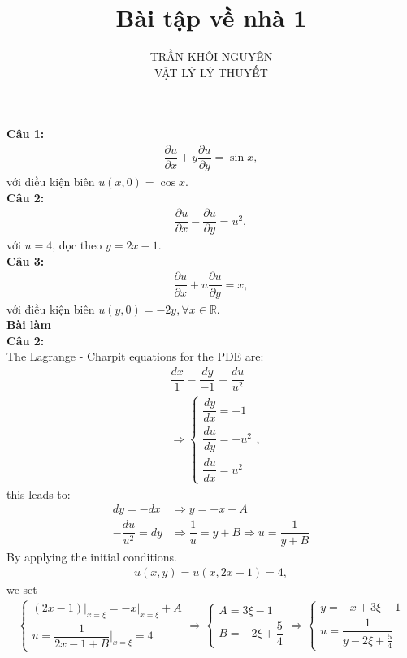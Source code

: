 \documentclass{article}
\title{\Huge{Bài tập về nhà 1}}
\newcommand{\f}[2]{\dfrac{#1}{#2}}
\newcommand{\at}[2]{\bigg\rvert_{#1}^{#2} }
\begin{document}
\setlength{\parindent}{20pt}
\newpage
\author{TRẦN KHÔI NGUYÊN \\ VẬT LÝ LÝ THUYẾT}
\maketitle
\noindent \textbf{Câu 1:}
\begin{align*}
	\f{\partial u}{\partial x} + y \f{\partial u}{\partial y} = \sin x,
\end{align*}
với điều kiện biên $u(x,0) = \cos x$. \\
\textbf{Câu 2:}
\begin{align*}
	\f{\partial u}{\partial x} - \f{\partial u}{\partial y} = u^{2},
\end{align*}
với $u = 4$, dọc theo $y = 2x - 1$.\\
\textbf{Câu 3:}
\begin{align*}
	\f{\partial u}{\partial x} + u \f{\partial u}{\partial y} = x,
\end{align*}
với điều kiện biên $u(y,0) = -2y, \forall x \in \mathbb{R}$. \\
\textbf{Bài làm}\\
\textbf{Câu 2:}\\
The Lagrange - Charpit equations for the PDE are:
\begin{align*}
	 & \f{dx}{1} = \f{dy}{-1} = \f{du}{u^{2}} \\
	 &
	\Rightarrow
	\begin{cases}
		\f{dy}{dx} = -1     \\
		\f{du}{dy} = -u^{2} \\
		\f{du}{dx} = u^{2}
	\end{cases},
\end{align*}
this leads to:
\begin{align*}
	dy = - dx           & \Rightarrow y = -x + A                                    \\
	-\f{du}{u^{2}} = dy & \Rightarrow \f{1}{u} = y + B \Rightarrow u = \f{1}{y + B}
\end{align*}
By applying the initial conditions.
\begin{align*}
	u(x,y) = u(x,2x - 1) = 4,
\end{align*}
we set
\begin{align*}
	\begin{cases}
		(2x - 1)\at{x = \xi}{} = - x \at{x = \xi}{} + A \\
		u = \f{1}{2x - 1 + B} \at{x = \xi}{} = 4
	\end{cases}
	\Rightarrow
	\begin{cases}
		A = 3 \xi - 1 \\
		B = -2\xi + \f{5}{4}
	\end{cases}
	\Rightarrow
	\begin{cases}
		y = - x + 3\xi - 1 \\
		u = \f{1}{y - 2\xi + \frac{5}{4}}
	\end{cases}
\end{align*}
\end{document}
